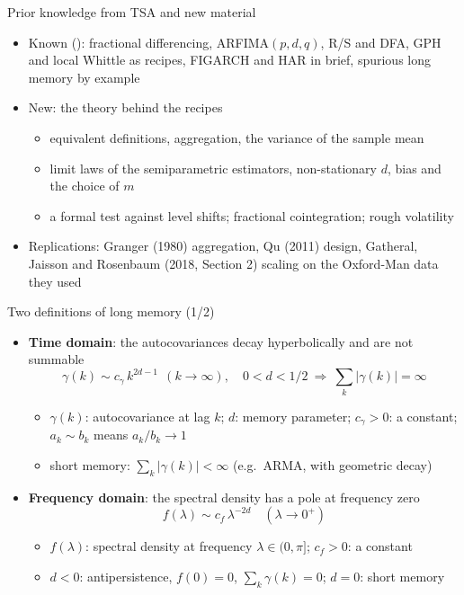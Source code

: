 \begin{frame}{Prior knowledge from TSA and new material}
\itemsize{\small}
\begin{itemize}
    \item Known (): fractional differencing, ARFIMA$(p,d,q)$, R/S and DFA, GPH and local Whittle as recipes, FIGARCH and HAR in brief, spurious long memory by example
    \item New: the theory behind the recipes
    \begin{itemize}
        \item equivalent definitions, aggregation, the variance of the sample mean
        \item limit laws of the semiparametric estimators, non-stationary $d$, bias and the choice of $m$
        \item a formal test against level shifts; fractional cointegration; rough volatility
    \end{itemize}
    \item Replications: Granger (1980) aggregation, Qu (2011) design, Gatheral, Jaisson and Rosenbaum (2018, Section 2) scaling on the Oxford-Man data they used
\end{itemize}
\end{frame}

\begin{frame}{Two definitions of long memory (1/2)}
\itemsize{\small}
\begin{itemize}
    \item \textbf{Time domain}: the autocovariances decay hyperbolically and are not summable
    \[ \gamma(k) \sim c_\gamma\,k^{2d-1} \ \ (k \to \infty), \quad 0 < d < 1/2 \ \Rightarrow\ \sum_k|\gamma(k)| = \infty \]
    \begin{itemize}
        \item $\gamma(k)$: autocovariance at lag $k$; $d$: memory parameter; $c_\gamma > 0$: a constant; $a_k \sim b_k$ means $a_k/b_k \to 1$
        \item short memory: $\sum_k|\gamma(k)| < \infty$ (e.g.\ ARMA, with geometric decay)
    \end{itemize}
    \item \textbf{Frequency domain}: the spectral density has a pole at frequency zero
    \[ f(\lambda) \sim c_f\,\lambda^{-2d} \quad (\lambda \to 0^+) \]
    \begin{itemize}
        \item $f(\lambda)$: spectral density at frequency $\lambda \in (0, \pi]$; $c_f > 0$: a constant
        \item $d < 0$: antipersistence, $f(0) = 0$, $\sum_k\gamma(k) = 0$; $d = 0$: short memory
    \end{itemize}
\end{itemize}
\end{frame}

